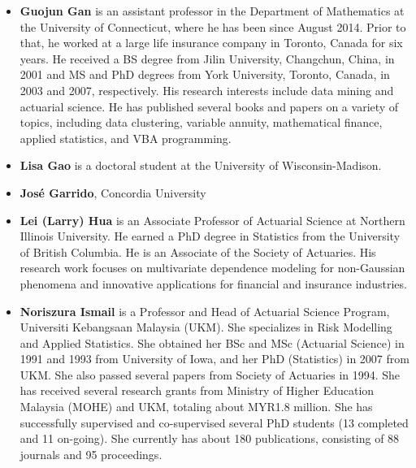 \documentclass[]{book}
\providecommand{\tightlist}{%
  \setlength{\itemsep}{0pt}\setlength{\parskip}{0pt}}
\begin{document}
\begin{itemize}
\item
  \textbf{Guojun Gan} is an assistant professor in the Department of
  Mathematics at the University of Connecticut, where he has been since
  August 2014. Prior to that, he worked at a large life insurance
  company in Toronto, Canada for six years. He received a BS degree from
  Jilin University, Changchun, China, in 2001 and MS and PhD degrees
  from York University, Toronto, Canada, in 2003 and 2007, respectively.
  His research interests include data mining and actuarial science. He
  has published several books and papers on a variety of topics,
  including data clustering, variable annuity, mathematical finance,
  applied statistics, and VBA programming.
\item
  \textbf{Lisa Gao} is a doctoral student at the University of
  Wisconsin-Madison.
\item
  \textbf{José Garrido}, Concordia University
\end{itemize}

\begin{itemize}
\tightlist
\item
  \textbf{Lei (Larry) Hua} is an Associate Professor of Actuarial
  Science at Northern Illinois University. He earned a PhD degree in
  Statistics from the University of British Columbia. He is an Associate
  of the Society of Actuaries. His research work focuses on multivariate
  dependence modeling for non-Gaussian phenomena and innovative
  applications for financial and insurance industries.
\end{itemize}

\begin{itemize}
\tightlist
\item
  \textbf{Noriszura Ismail} is a Professor and Head of Actuarial Science
  Program, Universiti Kebangsaan Malaysia (UKM). She specializes in Risk
  Modelling and Applied Statistics. She obtained her BSc and MSc
  (Actuarial Science) in 1991 and 1993 from University of Iowa, and her
  PhD (Statistics) in 2007 from UKM. She also passed several papers from
  Society of Actuaries in 1994. She has received several research grants
  from Ministry of Higher Education Malaysia (MOHE) and UKM, totaling
  about MYR1.8 million. She has successfully supervised and
  co-supervised several PhD students (13 completed and 11 on-going). She
  currently has about 180 publications, consisting of 88 journals and 95
  proceedings.
\end{itemize}
\end{document}
